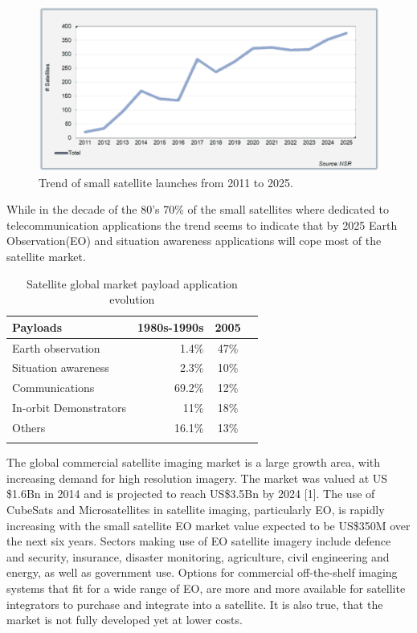 \documentclass[a4paper,twocolumn]{esapub2005} %
\begin{document}
\begin{figure}
\centering
\includegraphics[width = 5in]{images/trend_small_sats}
\caption{Trend of small satellite launches from 2011 to 2025.\label{fig:single}}
\end{figure}

While in the decade of the 80's 70\% of the small satellites where dedicated to telecommunication applications the trend seems to indicate that by 2025 Earth Observation(EO) and situation awareness applications will cope most of the satellite market.

\begin{table} [!h]
  \begin{center}
    \caption{Satellite global market payload application evolution}\vspace{1em}
    \renewcommand{\arraystretch}{1.2}
    \begin{tabular}[h]{lrcc}
      \hline
      Payloads & 1980s-1990s  &  2005 \\
      \hline
      Earth observation  & 1.4\% & 47\%\\
      Situation awareness  & 2.3\% & 10\%\\
      Communications  & 69.2\% & 12\%\\
      In-orbit Demonstrators  & 11\% & 18\%\\
      Others  & 16.1\% & 13\%\\
      \hline \\
      \end{tabular}
    \label{tab:table}
  \end{center}
\end{table}

The global commercial satellite imaging market is a large growth area, with increasing demand for high resolution imagery. The market was valued at US \$1.6Bn in 2014 and is projected to reach US\$3.5Bn by 2024 [1]. The use of CubeSats and Microsatellites in satellite imaging, particularly EO, is rapidly increasing with the small satellite EO market value expected to be US\$350M over the next six years. Sectors making use of EO satellite imagery include defence and security, insurance, disaster monitoring, agriculture, civil engineering and energy, as well as government use. Options for commercial off-the-shelf imaging systems that fit for a wide range of EO, are more and more available for satellite integrators to purchase and integrate into a satellite. It is also true, that the market is not fully developed yet at lower costs.
\end{document}
